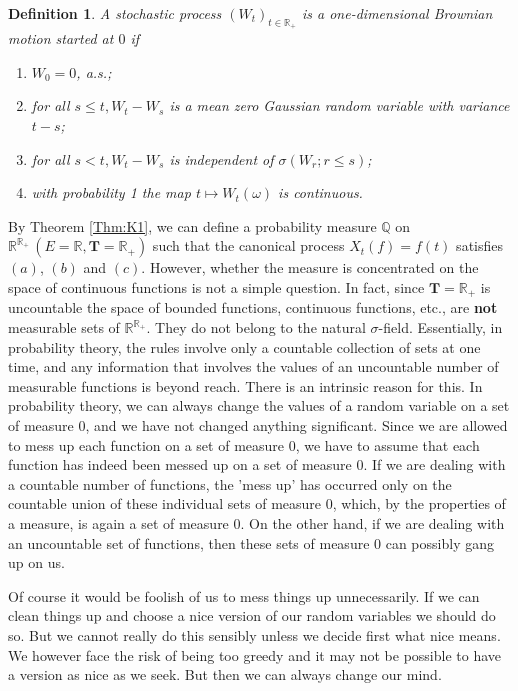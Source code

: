 \documentclass[twoside, 12pt]{book}
\numberwithin{equation}{chapter}
\newtheorem{definition}[theorem]{Definition}
\def\mQ{{\mathbb Q}}
\def\mR{{\mathbb R}}
\def\bT{{\mathbf T}}
\def\leq{\leqslant}
\begin{document}
	\begin{definition}\label{Def:BM}
		A stochastic process $(W_t)_{t\in \mR_+}$ is a one-dimensional Brownian motion started at $0$ if
		\begin{enumerate}
			\item[(a)] $W_0=0$, a.s.;
			\item[(b)] for all $s \leq t, W_t-W_s$ is a mean zero Gaussian random variable with variance $t-s$;
			\item[(c)] for all $s<t, W_t-W_s$ is independent of $\sigma\left(W_r ; r \leq s\right)$;
			\item[(d)] with probability 1 the map $t \mapsto W_t(\omega)$ is continuous.
		\end{enumerate}
	\end{definition}
	By Theorem \ref{Thm:K1}, we can define a probability measure $\mQ$ on $\mR^{\mR_+}\, (E=\mR, \bT=\mR_+)$ such that the canonical process $X_t(f)=f(t)$ satisfies $(a)$, $(b)$ and $(c)$. However, whether the measure is concentrated on the space of continuous functions is not a simple question. In fact, since $\bT=\mR_+$ is uncountable the space of bounded functions, continuous functions, etc., are \textbf{not} measurable sets of $\mR^{\mR_+}$. They do not belong to the natural $\sigma$-field. Essentially, in probability theory, the rules involve only a countable collection of sets at one time, and any information that involves the values of an uncountable number of measurable functions is beyond reach. There is an intrinsic reason for this. In probability theory, we can always change the values of a random variable on a set of measure $0$, and we have not changed anything significant. Since we are allowed to mess up each function on a set of measure $0$, we have to assume that each function has indeed been messed up on a set of measure 0. If we are dealing with a countable number of functions, the 'mess up' has occurred only on the countable union of these individual sets of measure $0$, which, by the properties of a measure, is again a set of measure $0$. On the other hand, if we are dealing with an uncountable set of functions, then these sets of measure $0$ can possibly gang up on us.
	
	Of course it would be foolish of us to mess things up unnecessarily. If we can clean things up and choose a nice version of our random variables we should do so. But we cannot really do this sensibly unless we decide first what nice means. We however face the risk of being too greedy and it may not be possible to have a version as nice as we seek. But then we can always change our mind. 
	
\end{document}

